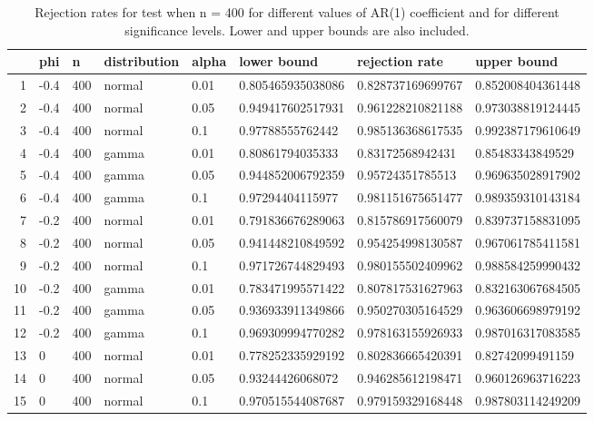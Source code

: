\begin{table}[ht]
\centering
\caption{Rejection rates for test when n = 400 for 
                   different values of AR(1) coefficient and for different 
                   significance levels. Lower and upper bounds are also 
                   included.} 
\label{table:rr_400}
\begin{tabular}{rlllllll}
  \hline
 & phi & n & distribution & alpha & lower bound & rejection rate & upper bound \\ 
  \hline
1 & -0.4 & 400 & normal & 0.01 & 0.805465935038086 & 0.828737169699767 & 0.852008404361448 \\ 
  2 & -0.4 & 400 & normal & 0.05 & 0.949417602517931 & 0.961228210821188 & 0.973038819124445 \\ 
  3 & -0.4 & 400 & normal & 0.1 & 0.97788555762442 & 0.985136368617535 & 0.992387179610649 \\ 
  4 & -0.4 & 400 & gamma & 0.01 & 0.80861794035333 & 0.83172568942431 & 0.85483343849529 \\ 
  5 & -0.4 & 400 & gamma & 0.05 & 0.944852006792359 & 0.95724351785513 & 0.969635028917902 \\ 
  6 & -0.4 & 400 & gamma & 0.1 & 0.97294404115977 & 0.981151675651477 & 0.989359310143184 \\ 
  7 & -0.2 & 400 & normal & 0.01 & 0.791836676289063 & 0.815786917560079 & 0.839737158831095 \\ 
  8 & -0.2 & 400 & normal & 0.05 & 0.941448210849592 & 0.954254998130587 & 0.967061785411581 \\ 
  9 & -0.2 & 400 & normal & 0.1 & 0.971726744829493 & 0.980155502409962 & 0.988584259990432 \\ 
  10 & -0.2 & 400 & gamma & 0.01 & 0.783471995571422 & 0.807817531627963 & 0.832163067684505 \\ 
  11 & -0.2 & 400 & gamma & 0.05 & 0.936933911349866 & 0.950270305164529 & 0.963606698979192 \\ 
  12 & -0.2 & 400 & gamma & 0.1 & 0.969309994770282 & 0.978163155926933 & 0.987016317083585 \\ 
  13 & 0 & 400 & normal & 0.01 & 0.778252335929192 & 0.802836665420391 & 0.82742099491159 \\ 
  14 & 0 & 400 & normal & 0.05 & 0.93244426068072 & 0.946285612198471 & 0.960126963716223 \\ 
  15 & 0 & 400 & normal & 0.1 & 0.970515544087687 & 0.979159329168448 & 0.987803114249209 \\ 

\end{tabular}
\end{table}
